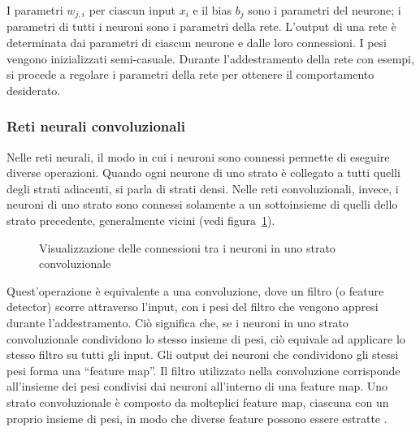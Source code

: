 I parametri $w_{j,i}$ per ciascun input $x_i$ e il bias $b_j$ sono i parametri
del neurone; i parametri di tutti i neuroni sono i parametri della rete.
L'output di una rete è determinata dai parametri di ciascun neurone e dalle loro
connessioni. I pesi vengono inizializzati semi-casuale. Durante l'addestramento della rete
con esempi, si procede a regolare i parametri della rete per ottenere il
comportamento desiderato.

\subsubsection{Reti neurali convoluzionali}

Nelle reti neurali, il modo in cui i neuroni sono connessi permette di
eseguire diverse operazioni. Quando ogni neurone di uno strato è collegato a
tutti quelli degli strati adiacenti, si parla di strati densi. Nelle reti
convoluzionali, invece, i neuroni di uno strato sono connessi solamente a un
sottoinsieme di quelli dello strato precedente, generalmente vicini (vedi
figura~\ref{fig:convnet}).

\begin{figure}[!ht]
    \centering
    \begin{neuralnetwork}[height=4]
        \newcommand{\nodetextclear}[2]{}
        \hiddenlayer[count=4, bias=false,  text=\nodetextclear]        
        \hiddenlayer[count=4, bias=false,  text=\nodetextclear] 
        \link[from layer=0, to layer=1, from node=1, to node=1]
        \link[from layer=0, to layer=1, from node=2, to node=2]
        \link[from layer=0, to layer=1, from node=3, to node=3]
        \link[from layer=0, to layer=1, from node=4, to node=4]

        \link[from layer=0, to layer=1, from node=1, to node=2]
        \link[from layer=0, to layer=1, from node=2, to node=3]
        \link[from layer=0, to layer=1, from node=3, to node=4]

        \link[from layer=0, to layer=1, from node=4, to node=3]
        \link[from layer=0, to layer=1, from node=3, to node=2]
        \link[from layer=0, to layer=1, from node=2, to node=1]
    \end{neuralnetwork}
    \caption{Visualizzazione delle connessioni tra i neuroni in uno strato
    convoluzionale} 
    \label{fig:convnet}
\end{figure}

Quest'operazione è equivalente a una convoluzione, dove un filtro (o feature
detector) scorre attraverso l'input, con i pesi del filtro che vengono appresi
durante l'addestramento. Ciò significa che, se i neuroni in uno strato
convoluzionale condividono lo stesso insieme di pesi, ciò equivale ad
applicare lo stesso filtro su tutti gli input. Gli output dei neuroni che
condividono gli stessi pesi forma una ``feature map''. Il filtro utilizzato
nella convoluzione corrisponde all'insieme dei pesi condivisi dai neuroni
all'interno di una feature map. Uno strato convoluzionale è composto da
molteplici feature map, ciascuna con un proprio insieme di pesi, in modo che
diverse feature possono essere estratte \cite{lecun1998}.

